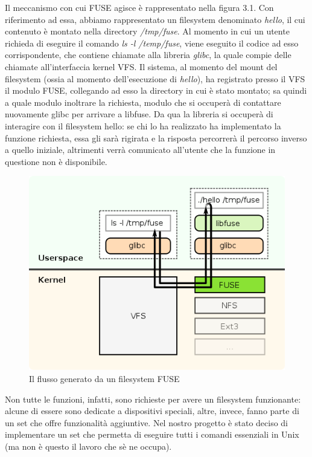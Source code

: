 Il meccanismo con cui FUSE agisce è rappresentato nella figura 3.1. Con riferimento ad essa, abbiamo rappresentato un filesystem denominato \emph{hello}, il cui contenuto è montato nella directory \emph{/tmp/fuse}. Al momento in cui un utente richieda di eseguire il comando \emph{ls -l /temp/fuse}, viene eseguito il codice ad esso corrispondente, che contiene chiamate alla libreria \emph{glibc}, la quale compie delle chiamate all'interfaccia kernel VFS. Il sistema, al momento del mount del filesystem (ossia al momento dell'esecuzione di \emph{hello}), ha registrato presso il VFS il modulo FUSE, collegando ad esso la directory in cui è stato montato; sa quindi a quale modulo inoltrare la richiesta, modulo che si occuperà di contattare nuovamente glibc per arrivare a libfuse. Da qua la libreria si occuperà di interagire con il filesystem hello: se chi lo ha realizzato ha implementato la funzione richiesta, essa gli sarà rigirata e la risposta percorrerà il percorso inverso a quello iniziale, altrimenti verrà comunicato all'utente che la funzione in questione non è disponibile. 
\begin{figure}
\centering
\includegraphics[scale=0.5]{./fuse.png}
\caption{Il flusso generato da un filesystem FUSE}
\label{fig:1}
\end{figure}

Non tutte le funzioni, infatti, sono richieste per avere un filesystem funzionante: alcune di essere sono dedicate a dispositivi speciali, altre, invece, fanno parte di un set che offre funzionalità aggiuntive. Nel nostro progetto è stato deciso di implementare un set che permetta di eseguire tutti i comandi essenziali in Unix (ma non è questo il lavoro che sè ne occupa).

